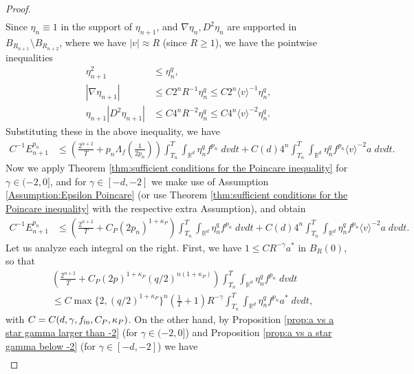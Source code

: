 \documentclass[12pt,american]{amsart}
\numberwithin{equation}{section}
\theoremstyle{plain}
\theoremstyle{definition}                  %
\def\astar{{a^*}}
\def\fin{f_{\textnormal{in}}}
\begin{document}
\begin{proof}
\begin{align*}
  \end{align*}	
  Since $\eta_n \equiv 1$ in the support of $\eta_{n+1}$, and $\nabla \eta_n,D^2\eta_n$ are supported in $B_{R_{n+1}}\setminus B_{R_{n+2}}$, where we have $|v|\approx R$ (since $R\geq 1$), we have the pointwise inequalities
  \begin{align*}
    \eta_{n+1}^2 & \leq \eta_{n}^q,\\
    |\nabla \eta_{n+1}| & \leq C2^nR^{-1} \eta_n^q \leq C2^n\langle v\rangle^{-1}\eta_n^q,\\
    \eta_{n+1}|D^2\eta_{n+1}| & \leq C4^nR^{-2}\eta_n^q\leq C 4^n\langle v\rangle^{-2}\eta_n^q.		  
  \end{align*}	  
  Substituting these in the above inequality, we have
  \begin{align*}	
    C^{-1}E_{n+1}^{p_{n}} & \leq \left ( \frac{2^{n+2}}{T}+p_n\Lambda_f(\tfrac{1}{2p_n}) \right )\int_{T_n}^T \int_{\mathbb{R}^d}  \eta_n^q f^{p_n} \;dvdt  +C(d)4^n \int_{T_n}^T \int_{\mathbb{R}^d}  \eta_n^q f^{p_n} \langle v\rangle^{-2}a\;dvdt.
  \end{align*}	
  Now we apply Theorem \ref{thm:sufficient conditions for the Poincare inequality} for $\gamma \in (-2,0]$, and for $\gamma \in [-d,-2]$ we make use of Assumption \ref{Assumption:Epsilon Poincare} (or use Theorem \ref{thm:sufficient conditions for the Poincare inequality} with the respective extra Assumption), and obtain
  \begin{align*}	
    C^{-1}E_{n+1}^{p_{n}} & \leq \left ( \frac{2^{n+2}}{T}+C_P(2p_n)^{1+\kappa_P} \right )\int_{T_n}^T \int_{\mathbb{R}^d}  \eta_n^q f^{p_n} \;dvdt  +C(d)4^n \int_{T_n}^T \int_{\mathbb{R}^d}  \eta_n^q f^{p_n} \langle v\rangle^{-2}a\;dvdt.
  \end{align*}	  
  Let us analyze each integral on the right. First, we have $1\leq CR^{-\gamma}\astar$ in $B_{R}(0)$, so that
  \begin{align*}
    & \left ( \frac{2^{n+2}}{T}+C_P(2p)^{1+\kappa_P}(q/2)^{n(1+\kappa_P)}  \right )\int_{T_n}^T \int_{\mathbb{R}^d}  \eta_n^q f^{p_n} \;dvdt \\
    & \leq C \max\{2,(q/2)^{1+\kappa_P}\}^n\left ( \frac{1}{T}+1 \right )R^{-\gamma} \int_{T_n}^T \int_{\mathbb{R}^d}  \eta_n^q f^{p_n}\astar \;dvdt,	  
  \end{align*}	  
  with $C= C(d,\gamma,\fin,C_P,\kappa_P)$. On the other hand, by Proposition \ref{prop:a vs a star gamma larger than -2} (for $\gamma \in (-2,0]$) and Proposition \ref{prop:a vs a star gamma below -2} (for $\gamma\in [-d,-2]$) we have
  \begin{align*}

\end{align*}
\end{proof}
\end{document}
